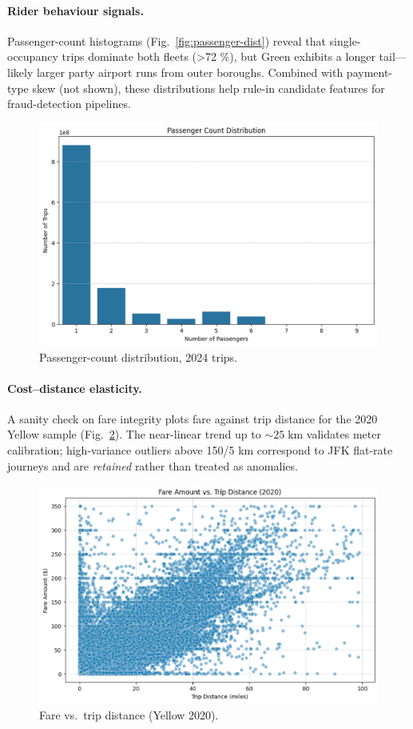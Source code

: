 \documentclass[conference]{IEEEtran}
\begin{document}
\paragraph*{Rider behaviour signals.}
Passenger-count histograms (Fig.~\ref{fig:passenger-dist}) reveal that
single-occupancy trips dominate both fleets (>72 \%), but Green exhibits a
longer tail—likely larger party airport runs from outer boroughs.  Combined
with payment-type skew (not shown), these distributions help rule-in candidate
features for fraud-detection pipelines.

\begin{figure}[htbp]
  \centering
  \includegraphics[width=0.9\linewidth]{figures/passenger_count_yellow.png}
  \caption{Passenger-count distribution, 2024 trips.}
  \label{fig:passenger-count-yellow}
\end{figure}

\paragraph*{Cost–distance elasticity.}
A sanity check on fare integrity plots fare against trip distance for the 2020
Yellow sample (Fig.~\ref{fig:fare-vs-dist}).  The near-linear trend up to
\(\sim\!25\;\mathrm{km}\) validates meter calibration; high-variance outliers
above 150/5 km correspond to JFK flat-rate journeys and are \emph{retained}
rather than treated as anomalies.

\begin{figure}[htbp]
  \centering
  \includegraphics[width=0.9\linewidth]{figures/fare_vs_distance.png}
  \caption{Fare vs.\ trip distance (Yellow 2020).}
  \label{fig:fare-vs-dist}
\end{figure}
\end{document}
